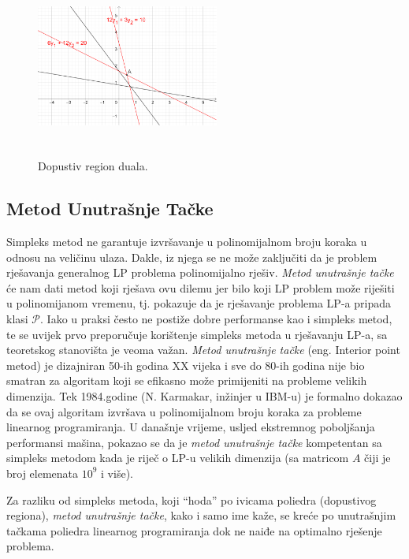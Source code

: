\documentclass[a4paper, utf8, 11pt, colorlinks]{article}
\begin{document}
\begin{figure}[!ht]
    \centering
    \includegraphics[width=170pt, height=170pt]{fig6.eps}
    \caption{Dopustiv region duala.}
    \label{fig:fig6-dual-region}
\end{figure}


\subsection{Metod Unutrašnje Tačke}

Simpleks metod ne garantuje   izvršavanje u polinomijalnom broju koraka u odnosu na veličinu ulaza. %
Dakle, iz njega se ne može zaključiti da je problem rješavanja generalnog LP problema   polinomijalno rješiv. \emph{Metod unutrašnje tačke} će nam dati metod koji rješava ovu dilemu jer bilo koji LP problem može riješiti u polinomijanom vremenu, tj. pokazuje da je rješavanje problema LP-a pripada klasi $\mathcal{P}$. Iako u praksi često ne postiže dobre  performanse kao i simpleks metod, te se uvijek prvo preporučuje korištenje simpleks metoda u rješavanju LP-a, sa teoretskog stanovišta je veoma važan.  \emph{Metod unutrašnje tačke} (eng. Interior point metod) je dizajniran 50-ih godina XX vijeka i sve do 80-ih godina nije bio smatran za algoritam koji se efikasno može primijeniti na probleme velikih dimenzija. Tek 1984.godine (N. Karmakar, inžinjer u IBM-u) je formalno dokazao da se ovaj algoritam izvršava u polinomijalnom broju koraka za probleme linearnog programiranja. U današnje vrijeme, usljed ekstremnog poboljšanja performansi mašina, pokazao se da je \emph{metod unutrašnje tačke} kompetentan sa simpleks metodom kada je riječ o LP-u velikih dimenzija (sa matricom $A$ čiji je broj elemenata $10^9$ i više).

Za razliku od simpleks metoda, koji ``hoda'' po ivicama poliedra (dopustivog regiona), \emph{metod unutrašnje tačke}, kako i samo ime kaže, se kreće po unutrašnjim tačkama poliedra linearnog programiranja dok ne naiđe na optimalno rješenje problema. 
\end{document}
